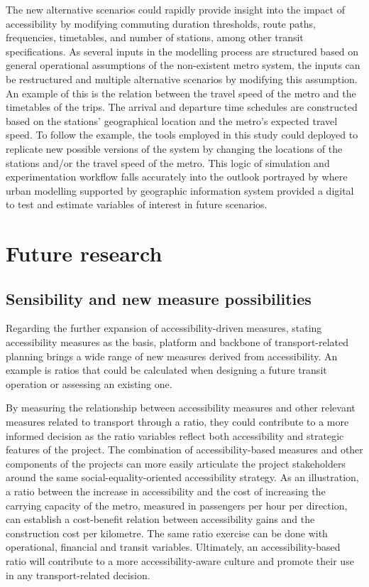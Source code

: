 \documentclass[12pt, a4paper]{report}
\begin{document}
The new alternative scenarios could rapidly provide insight into the impact of accessibility by modifying commuting duration thresholds, route paths, frequencies, timetables, and number of stations, among other transit specifications. As several inputs in the modelling process are structured based on general operational assumptions of the non-existent metro system, the inputs can be restructured and multiple alternative scenarios by modifying this assumption. An example of this is the relation between the travel speed of the metro and the timetables of the trips. The arrival and departure time schedules are constructed based on the stations' geographical location and the metro's expected travel speed. To follow the example, the tools employed in this study could deployed to replicate new possible versions of the system by changing the locations of the stations and/or the travel speed of the metro. This logic of simulation and experimentation workflow falls accurately into the outlook portrayed by \cite{wilsonFutureUrbanModelling2018, battyUrbanModeling2009a,longleyGeographicInformationScience2015} where urban modelling supported by geographic information system provided a digital to test and estimate variables of interest in future scenarios. 


\section{Future research}

\subsection{Sensibility and new measure possibilities}


Regarding the further expansion of accessibility-driven measures, stating accessibility measures as the basis, platform and backbone of transport-related planning brings a wide range of new measures derived from accessibility. An example is ratios that could be calculated when designing a future transit operation or assessing an existing one. 

By measuring the relationship between accessibility measures and other relevant measures related to transport through a ratio, they could contribute to a more informed decision as the ratio variables reflect both accessibility and strategic features of the project. The combination of accessibility-based measures and other components of the projects can more easily articulate the project stakeholders around the same social-equality-oriented accessibility strategy. As an illustration, a ratio between the increase in accessibility and the cost of increasing the carrying capacity of the metro, measured in passengers per hour per direction, can establish a cost-benefit relation between accessibility gains and the construction cost per kilometre. The same ratio exercise can be done with operational, financial and transit variables. Ultimately, an accessibility-based ratio will contribute to a more accessibility-aware culture and promote their use in any transport-related decision.
\end{document}
